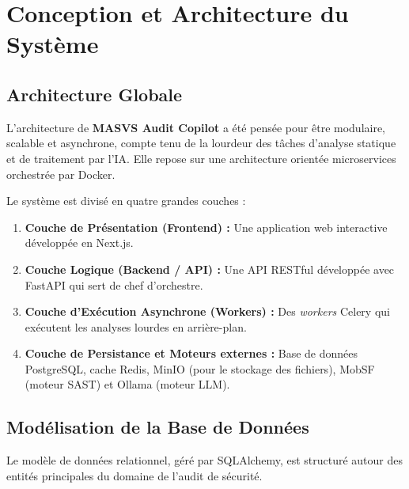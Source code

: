 \chapter{Conception et Architecture du Système}
\label{chap:conception}

\section{Architecture Globale}
L'architecture de \textbf{MASVS Audit Copilot} a été pensée pour être modulaire, scalable et asynchrone, compte tenu de la lourdeur des tâches d'analyse statique et de traitement par l'IA. Elle repose sur une architecture orientée microservices orchestrée par Docker.

Le système est divisé en quatre grandes couches :
\begin{enumerate}[label=\textbf{\textcolor{AccentCyan}{\arabic*.}}]
    \item \textbf{Couche de Présentation (Frontend) :} Une application web interactive développée en Next.js.
    \item \textbf{Couche Logique (Backend / API) :} Une API RESTful développée avec FastAPI qui sert de chef d'orchestre.
    \item \textbf{Couche d'Exécution Asynchrone (Workers) :} Des \textit{workers} Celery qui exécutent les analyses lourdes en arrière-plan.
    \item \textbf{Couche de Persistance et Moteurs externes :} Base de données PostgreSQL, cache Redis, MinIO (pour le stockage des fichiers), MobSF (moteur SAST) et Ollama (moteur LLM).
\end{enumerate}

\section{Modélisation de la Base de Données}
Le modèle de données relationnel, géré par SQLAlchemy, est structuré autour des entités principales du domaine de l'audit de sécurité.

